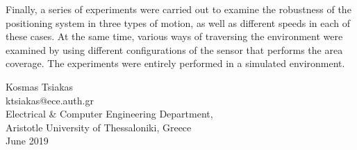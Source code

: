{Finally, a series of experiments were carried out to examine the robustness of the positioning system in three types of motion, as well as different speeds in each of these cases. At the same time, various ways of traversing the environment were examined by using different configurations of the sensor that performs the area coverage. The experiments were entirely performed in a simulated environment.

\begin{flushright}
  \vspace{2cm}
  Kosmas Tsiakas
  \\
  ktsiakas@ece.auth.gr
  \\
  Electrical \& Computer Engineering Department,
  \\
  Aristotle University of Thessaloniki, Greece
  \\
  June 2019
\end{flushright}

}

